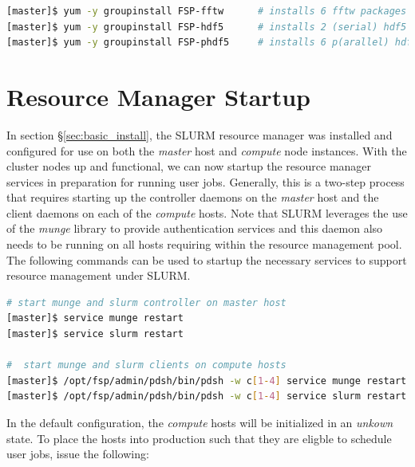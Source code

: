 \documentclass[letterpaper]{article}
\begin{document}
\begin{lstlisting}[language=bash]
[master]$ yum -y groupinstall FSP-fftw      # installs 6 fftw packages
[master]$ yum -y groupinstall FSP-hdf5      # installs 2 (serial) hdf5 packages
[master]$ yum -y groupinstall FSP-phdf5     # installs 6 p(arallel) hdf5 packages
\end{lstlisting}

\section{Resource Manager Startup}

In section \S\ref{sec:basic_install}, the SLURM resource manager was installed
and configured for use on both the {\em master} host and {\em compute} node
instances. With the cluster nodes up and functional, we can now startup the
resource manager services in preparation for running user jobs. Generally, this
is a two-step process that requires starting up the controller daemons on the {\em
  master} host and the client daemons on each of the {\em compute} hosts.  
Note that SLURM leverages the use of the {\em munge} library to provide
authentication services and this daemon also needs to be running on all hosts
requiring within the resource management pool. 
The following commands can be used to startup the necessary services to support
resource management under SLURM.

\begin{lstlisting}[language=bash]
# start munge and slurm controller on master host
[master]$ service munge restart
[master]$ service slurm restart

#  start munge and slurm clients on compute hosts
[master]$ /opt/fsp/admin/pdsh/bin/pdsh -w c[1-4] service munge restart
[master]$ /opt/fsp/admin/pdsh/bin/pdsh -w c[1-4] service slurm restart
\end{lstlisting}

In the default configuration, the {\em compute} hosts will be initialized in an
{\em unkown} state. To place the hosts into production such that they are
eligble to schedule user jobs, issue the following:
\end{document}
